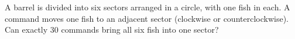 A barrel is divided into six sectors arranged in a circle, with one fish in each. A command moves one fish to an adjacent sector (clockwise or counterclockwise). Can exactly $30$ commands bring all six fish into one sector?
